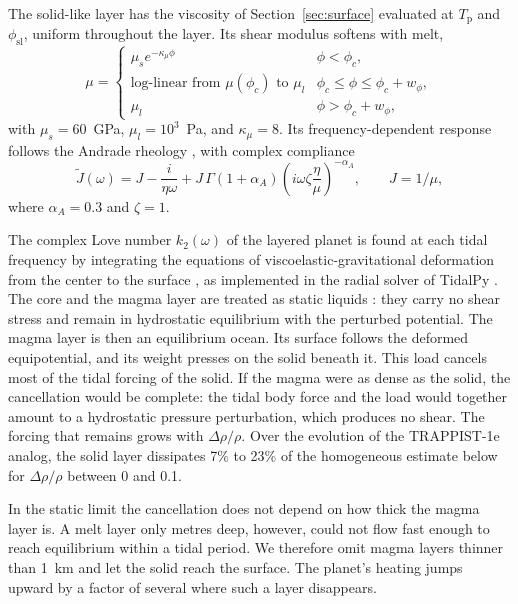 \documentclass[11pt]{article}
\newcommand{\Tp}{T_\mathrm{p}}
\begin{document}
The solid-like layer has the viscosity of Section~\ref{sec:surface} evaluated at $\Tp$ and $\phi_\mathrm{sl}$, uniform throughout the layer. Its shear modulus softens with melt,
\begin{equation}
\mu = \begin{cases}
\mu_s e^{-\kappa_\mu \phi} & \phi < \phi_c, \\
\text{log-linear from } \mu(\phi_c) \text{ to } \mu_l & \phi_c \le \phi \le \phi_c + w_\phi, \\
\mu_l & \phi > \phi_c + w_\phi,
\end{cases}
\end{equation}
with $\mu_s = 60$~GPa, $\mu_l = 10^3$~Pa, and $\kappa_\mu = 8$. Its frequency-dependent response follows the Andrade rheology \citep{Andrade1910,Efroimsky2012}, with complex compliance
\begin{equation}
\tilde{J}(\omega) = J - \frac{i}{\eta \omega} + J \, \Gamma(1 + \alpha_A) \left( i \omega \zeta \frac{\eta}{\mu}
\right)^{-\alpha_A}, \qquad J = 1/\mu,
\end{equation}
where $\alpha_A = 0.3$ and $\zeta = 1$.

The complex Love number $k_2(\omega)$ of the layered planet is found at each tidal frequency by integrating the equations of viscoelastic-gravitational deformation from the center to the surface \citep{Takeuchi1972}, as implemented in the radial solver of TidalPy \citep{Renaud2021}. The core and the magma layer are treated as static liquids \citep{Saito1974}: they carry no shear stress and remain in hydrostatic equilibrium with the perturbed potential. The magma layer is then an equilibrium ocean. Its surface follows the deformed equipotential, and its weight presses on the solid beneath it. This load cancels most of the tidal forcing of the solid. If the magma were as dense as the solid, the cancellation would be complete: the tidal body force and the load would together amount to a hydrostatic pressure perturbation, which produces no shear. The forcing that remains grows with $\Delta\rho / \rho$. Over the evolution of the TRAPPIST-1e analog, the solid layer dissipates 7\% to 23\% of the homogeneous estimate below for $\Delta\rho / \rho$ between 0 and 0.1.

In the static limit the cancellation does not depend on how thick the magma layer is. A melt layer only metres deep, however, could not flow fast enough to reach equilibrium within a tidal period. We therefore omit magma layers thinner than 1~km and let the solid reach the surface. The planet's heating jumps upward by a factor of several where such a layer disappears.
\end{document}
